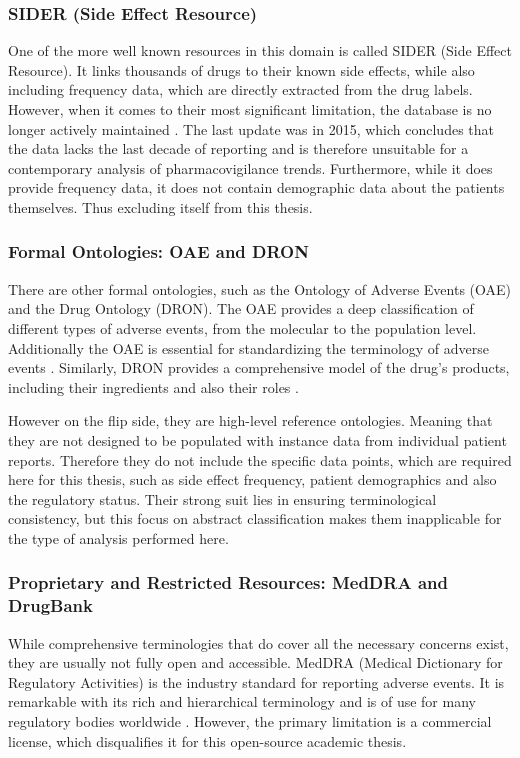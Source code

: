 \subsubsection*{SIDER (Side Effect Resource)}
One of the more well known resources in this domain is called SIDER (Side Effect Resource). It links thousands of drugs to their known side effects, while also including frequency data, which are directly extracted from the drug labels. However, when it comes to their most significant limitation, the database is no longer actively maintained \cite{EMBLsiderWebsite}. The last update was in 2015, which concludes that the data lacks the last decade of reporting and is therefore unsuitable for a contemporary analysis of pharmacovigilance trends. Furthermore, while it does provide frequency data, it does not contain demographic data about the patients themselves. Thus excluding itself from this thesis.
\subsubsection*{Formal Ontologies: OAE and DRON}
There are other formal ontologies, such as the Ontology of Adverse Events (OAE) and the Drug Ontology (DRON). The OAE provides a deep classification of different types of adverse events, from the molecular to the population level. Additionally the OAE is essential for standardizing the terminology of adverse events \cite{HeGroupOntobee}. Similarly, DRON provides a comprehensive model of the drug's products, including their ingredients and also their roles \cite{OBOFoundryDRON}.

However on the flip side, they are high-level reference ontologies. Meaning that they are not designed to be populated with instance data from individual patient reports. Therefore they do not include the specific data points, which are required here for this thesis, such as side effect frequency, patient demographics and also the regulatory status. Their strong suit lies in ensuring terminological consistency, but this focus on abstract classification makes them inapplicable for the type of analysis performed here. 
\subsubsection*{Proprietary and Restricted Resources: MedDRA and DrugBank}
While comprehensive terminologies that do cover all the necessary concerns exist, they are usually not fully open and accessible. MedDRA (Medical Dictionary for Regulatory Activities) is the industry standard for reporting adverse events. It is remarkable with its rich and hierarchical terminology and is of use for many regulatory bodies worldwide \cite{MedDRA2025}. However, the primary limitation is a commercial license, which disqualifies it for this open-source academic thesis.

